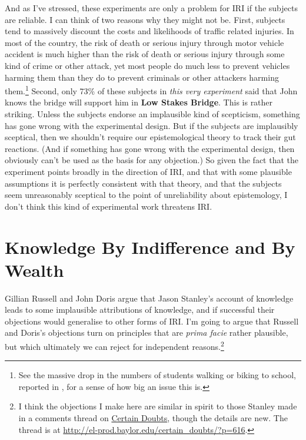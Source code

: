 \documentclass[oneside]{book}
\begin{document}
And as I've stressed, these experiments are only a problem for IRI if the subjects are reliable. I can think of two reasons why they might not be. First, subjects tend to massively discount the costs and likelihoods of traffic related injuries. In most of the country, the risk of death or serious injury through motor vehicle accident is much higher than the risk of death or serious injury through some kind of crime or other attack, yet most people do much less to prevent vehicles harming them than they do to prevent criminals or other attackers harming them.\footnote{See the massive drop in the numbers of students walking or biking to school, reported in \cite{Ham2008}, for a sense of how big an issue this is.} Second, only 73\% of these subjects in \textit{this very experiment} said that John knows the bridge will support him in \textbf{Low Stakes Bridge}. This is rather striking. Unless the subjects endorse an implausible kind of scepticism, something has gone wrong with the experimental design. But if the subjects are implausibly sceptical, then we shouldn't require our epistemological theory to track their gut reactions. (And if something has gone wrong with the experimental design, then obviously can't be used as the basis for any objection.) So given the fact that the experiment points broadly in the direction of IRI, and that with some plausible assumptions it is perfectly consistent with that theory, and that the subjects seem unreasonably sceptical to the point of unreliability about epistemology, I don't think this kind of experimental work threatens IRI.

\section{Knowledge By Indifference and By Wealth}

Gillian Russell and John Doris \citeyearpar{RussellDoris2008} argue that Jason Stanley's account of knowledge leads to some implausible attributions of knowledge, and if successful their objections would generalise to other forms of IRI. I'm going to argue that Russell and Doris's objections turn on principles that are \textit{prima facie} rather plausible, but which ultimately we can reject for independent reasons.\footnote{I think the objections I make here are similar in spirit to those Stanley made in a comments thread on \href{http://el-prod.baylor.edu/certain_doubts/?p=616}{Certain Doubts}, though the details are new. The thread is at \href{http://el-prod.baylor.edu/certain_doubts/?p=616}{http://el-prod.baylor.edu/certain\_doubts/?p=616}.}
\end{document}
